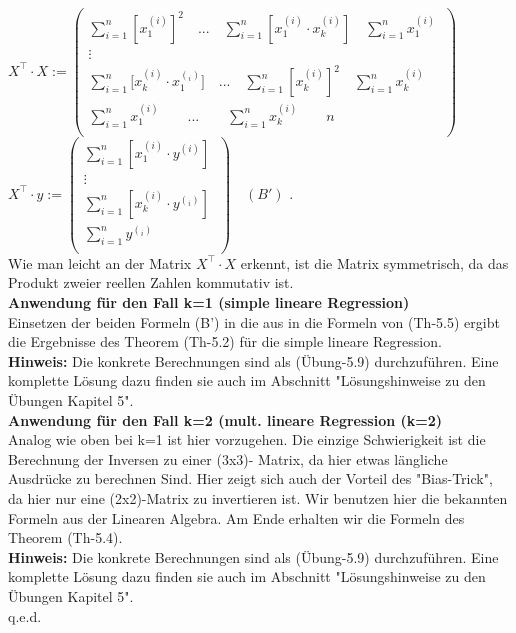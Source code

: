 \documentclass[12pt]{article}
\begin{document}
$ X^\top \cdot X := \left(
  \begin{array}{c}
     \sum\limits_{i=1}^n [{x_1^{(i)}}]^2 \quad ... \quad \sum \limits_{i=1}^n [{x_1^{(i)}} \cdot {x_k^{(i)}}] \quad  \sum\limits_{i=1}^n {x_1^{(i)}}  \\
    \vdots \\
    \sum\limits_{i=1}^n [{x_k^{(i)}} \cdot {{x_1^{(_i)}}] \quad ... \quad  \sum\limits_{i=1}^n [{x_k^{(i)}}]^2} \quad  \sum\limits_{i=1}^n {x_k^{(i)}} \\
  \sum\limits_{i=1}^n {x_1^{(i)}} \qquad ... \qquad \sum\limits_{i=1}^n {x_k^{(i)}} \qquad n \\
  \end{array}  \
  \right) \quad 
$    
$ X^\top \cdot y := \left(
  \begin{array}{c}
    \sum\limits_{i=1}^n [{x_1^{(i)}} \cdot {{y^{(i)}}}]\\
    \vdots \\
    \sum\limits_{i=1}^n [{{x_k^{(i)}}} \cdot {{y^{(_i)}}}] \\
    \sum\limits_{i=1}^n {{y^{(_i)}}} \\
  \end{array}  \
  \right) \quad (B')
$     
.\\[0.2cm]
Wie man leicht an der Matrix $X^\top \cdot X$ erkennt, ist die Matrix symmetrisch, da das Produkt zweier reellen Zahlen kommutativ ist.\\[0.3cm]
\textbf{Anwendung für den Fall k=1 (simple lineare Regression)} \\[0.2cm] 
Einsetzen der beiden Formeln (B') in die aus in die Formeln von (Th-5.5) ergibt die Ergebnisse des Theorem (Th-5.2) für die simple lineare Regression. \\
%
\textbf{Hinweis:} Die konkrete Berechnungen sind als (Übung-5.9) durchzuführen. Eine komplette Lösung dazu finden sie auch im Abschnitt "Lösungshinweise zu den Übungen Kapitel 5".\\
%
\textbf{Anwendung für den Fall k=2 (mult. lineare Regression (k=2)}\\[0.2cm] 
Analog wie oben bei k=1 ist hier vorzugehen. Die einzige Schwierigkeit ist die Berechnung der Inversen zu einer (3x3)- Matrix, da hier etwas längliche Ausdrücke zu berechnen Sind. Hier zeigt sich auch der Vorteil des "Bias-Trick", da hier nur eine (2x2)-Matrix zu invertieren ist. Wir benutzen hier die bekannten Formeln aus der Linearen Algebra. Am Ende erhalten wir die Formeln des Theorem (Th-5.4).  \\
\textbf{Hinweis:} Die konkrete Berechnungen sind als (Übung-5.9) durchzuführen. Eine komplette Lösung dazu finden sie auch im Abschnitt "Lösungshinweise zu den Übungen Kapitel 5".\\
%
q.e.d. \\    
\end{document}
